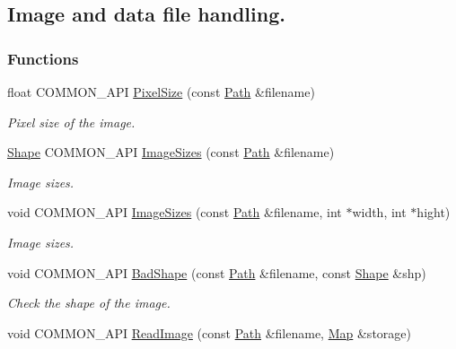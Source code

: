 \hypertarget{group__IO}{
\subsection{Image and data file handling.}
\label{group__IO}
}
\subsubsection*{Functions}
\begin{DoxyCompactItemize}
\item 
float COMMON\_\-API \hyperlink{group__IO_ga8e86fe71ec349e7de8ae5dd380ab2cab}{PixelSize} (const \hyperlink{classPath}{Path} \&filename)
\begin{DoxyCompactList}\small\item\em Pixel size of the image. \item\end{DoxyCompactList}\item 
\hyperlink{group__Types_ga777964671cb4315ce8c56c920db031e3}{Shape} COMMON\_\-API \hyperlink{group__IO_ga5ae888c778c04a7a8afa74e19ad636e2}{ImageSizes} (const \hyperlink{classPath}{Path} \&filename)
\begin{DoxyCompactList}\small\item\em Image sizes. \item\end{DoxyCompactList}\item 
void COMMON\_\-API \hyperlink{group__IO_ga7a0fd640fb3c44bdd8f1b86a644d5f33}{ImageSizes} (const \hyperlink{classPath}{Path} \&filename, int $\ast$width, int $\ast$hight)
\begin{DoxyCompactList}\small\item\em Image sizes. \item\end{DoxyCompactList}\item 
void COMMON\_\-API \hyperlink{group__IO_gaa67e9a34c63f309de5eeb303063ee230}{BadShape} (const \hyperlink{classPath}{Path} \&filename, const \hyperlink{group__Types_ga777964671cb4315ce8c56c920db031e3}{Shape} \&shp)
\begin{DoxyCompactList}\small\item\em Check the shape of the image. \item\end{DoxyCompactList}\item 
void COMMON\_\-API \hyperlink{group__IO_gae0c550c8fca773f133499e990ebe70b6}{ReadImage} (const \hyperlink{classPath}{Path} \&filename, \hyperlink{group__Types_ga8747378c016fc11d9ecbb98787248c25}{Map} \&storage)

\end{DoxyCompactItemize}
